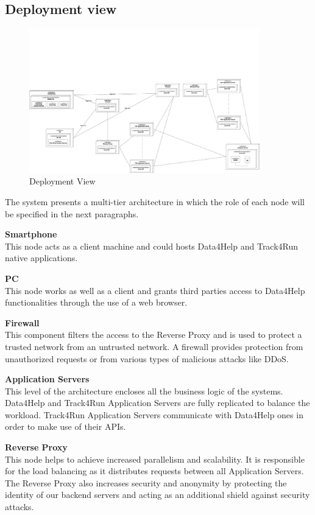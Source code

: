 \documentclass[titlepage]{article}
\begin{document}
\pagebreak



\subsection{Deployment view}

\begin{figure}[H]
	\center
  	\includegraphics[width=10cm]{DeploymentView.png}
  	\caption{Deployment View}
 	\label{fig:DEPVIEW}
\end{figure}
The system presents a multi-tier architecture in which the role of each node will be specified in the next paragraphs. 

{\bf Smartphone }\\ 
This node acts as a client machine and could hosts Data4Help and Track4Run native applications. 

{\bf PC }\\ 
This node works as well as a client and grants third parties access to Data4Help functionalities through the use of a web browser.

{\bf Firewall }\\ 
This component filters the access to the Reverse Proxy and is used to protect a trusted network from an untrusted network. A firewall provides protection from unauthorized requests or from various types of malicious attacks like DDoS.

{\bf Application Servers }\\ 
This level of the architecture encloses all the business logic of the systems. Data4Help and Track4Run Application Servers are fully replicated to balance the workload. Track4Run Application Servers communicate with Data4Help ones in order to make use of their APIs.

{\bf Reverse Proxy }\\ 
This node helps to achieve increased parallelism and scalability. It is responsible for the load balancing as it distributes requests between all Application Servers. The Reverse Proxy also increases security and anonymity by protecting the identity of our backend servers and acting as an additional shield against security attacks.
\end{document}
